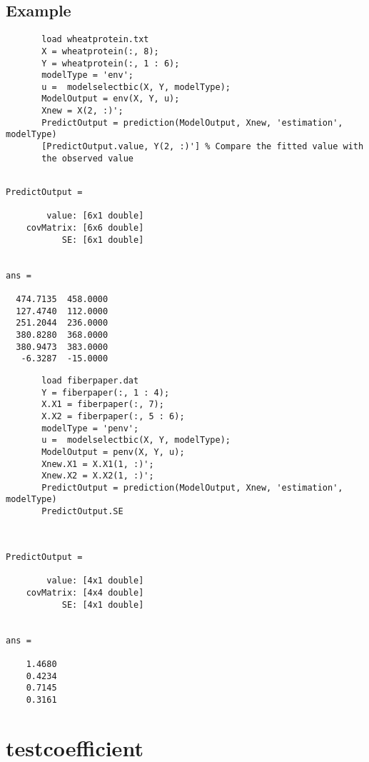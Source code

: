 \documentclass[a4paper,11pt,openany]{memoir}
\begin{document}
\subsection*{Example}


\begin{verbatim}       load wheatprotein.txt
       X = wheatprotein(:, 8);
       Y = wheatprotein(:, 1 : 6);
       modelType = 'env';
       u =  modelselectbic(X, Y, modelType);
       ModelOutput = env(X, Y, u);
       Xnew = X(2, :)';
       PredictOutput = prediction(ModelOutput, Xnew, 'estimation', modelType)
       [PredictOutput.value, Y(2, :)'] % Compare the fitted value with
       the observed value\end{verbatim}
             \color{lightgray}\ttfamily \begin{verbatim}

PredictOutput = 

        value: [6x1 double]
    covMatrix: [6x6 double]
           SE: [6x1 double]


ans =

  474.7135  458.0000
  127.4740  112.0000
  251.2044  236.0000
  380.8280  368.0000
  380.9473  383.0000
   -6.3287  -15.0000

\end{verbatim} \rmfamily
\color{black}
    
   
\begin{verbatim}       load fiberpaper.dat
       Y = fiberpaper(:, 1 : 4);
       X.X1 = fiberpaper(:, 7);
       X.X2 = fiberpaper(:, 5 : 6);
       modelType = 'penv';
       u =  modelselectbic(X, Y, modelType);
       ModelOutput = penv(X, Y, u);
       Xnew.X1 = X.X1(1, :)';
       Xnew.X2 = X.X2(1, :)';
       PredictOutput = prediction(ModelOutput, Xnew, 'estimation', modelType)
       PredictOutput.SE\end{verbatim}
    

        \color{lightgray}\ttfamily \begin{verbatim}


PredictOutput = 

        value: [4x1 double]
    covMatrix: [4x4 double]
           SE: [4x1 double]


ans =

    1.4680
    0.4234
    0.7145
    0.3161

\end{verbatim} \rmfamily
\color{black}
 
    
\newpage

\rmfamily
\color{black}\section{testcoefficient}
\end{document}
